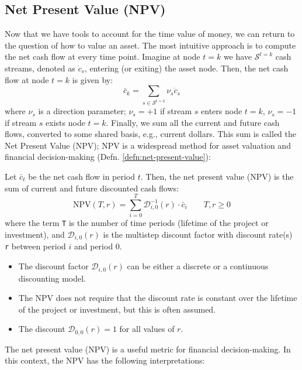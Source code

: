 \documentclass[11pt]{article}
\theoremstyle{definition}
\begin{document}
\subsection{Net Present Value (NPV)}
Now that we have tools to account for the time value of money, we can return to the question of how to value an asset. 
The most intuitive approach is to compute the net cash flow at every time point. Imagine at node $t=k$ we have $\mathcal{S}^{t=k}$ cash streams,
denoted as $\dot{c}_{s}$, entering (or exiting) the asset node. 
Then, the net cash flow at node $t=k$ is given by:
\begin{equation}\label{eq:net-cash-flow}
\bar{c}_{k} = \sum_{s\in\mathcal{S}^{t=k}}\nu_{s}\dot{c}_{s}
\end{equation}
where $\nu_{s}$ is a direction parameter; $\nu_{s}=+1$ if stream $s$ enters node $t=k$, $\nu_{s}=-1$ if stream $s$ exists node $t=k$. 
Finally, we sum all the current and future cash flows, converted to some shared basis, e.g., current dollars. 
This sum is called the Net Present Value (NPV); NPV is a widespread method for asset valuation and financial decision-making 
(Defn. \ref{defn:net-present-value}): 
\begin{definition}\label{defn:net-present-value}
Let $\bar{c}_{t}$ be the net cash flow in period $t$. 
Then, the net present value (NPV) is the sum of current and future discounted cash flows:
\begin{equation}    
\text{NPV}(T,r) = \sum_{i=0}^{T}{\mathcal{D}_{i,0}^{-1}}(r)\cdot\bar{c}_{i}\qquad{T,r\geq{0}}
\end{equation}
where the term \texttt{T} is the number of time periods 
(lifetime of the project or investment), and $\mathcal{D}_{i,0}(r)$ is the multistep discount factor with discount rate(s) \texttt{r}
between period $i$ and period $0$.
\begin{itemize}[leftmargin=*]
\item{The discount factor $\mathcal{D}_{i,0}(r)$ can be either a discrete or a continuous discounting model.}
\item{The NPV does not require that the discount rate is constant over the lifetime of the project or investment, but this is often assumed.}
\item{The discount  $\mathcal{D}_{0,0}(r) = 1$ for all values of $r$.}
\end{itemize}
\end{definition}
The net present value (NPV) is a useful metric for financial decision-making.
In this context, the NPV has the following interpretations:
\end{document}
